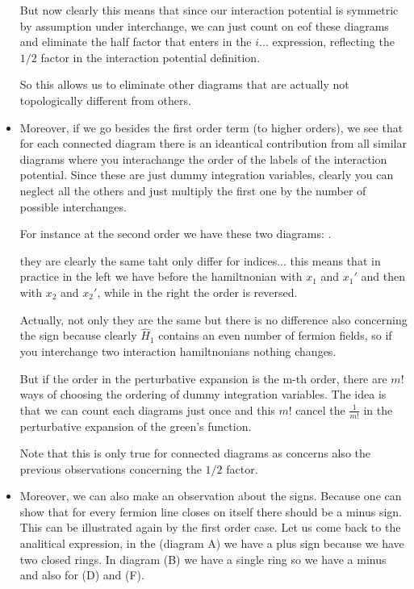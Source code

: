 \documentclass[../main/main.tex]{subfiles}
\begin{document}
\begin{itemize}
But now clearly this means that since our interaction potential is symmetric by assumption under interchange, we can just count on eof these diagrams and eliminate the half factor that enters in the \( i... \) expression, reflecting the \( 1/2 \) factor in the interaction potential definition.

So this allows us to eliminate other diagrams that are actually not topologically different  from others.


\item Moreover, if we go besides the first order term (to higher orders), we see that for each connected diagram there is an ideantical contribution from all similar diagrams where you interachange the order of the labels of the interaction potential. Since these are just dummy integration variables, clearly you can neglect all the others and just multiply the first one by the number of possible interchanges.

For instance at the second order we have these two diagrams:
.

they are clearly the same taht only differ for indices...
this means that in practice in the left we have before the hamiltnonian with \( x_1 \) and \( x_1' \) and then with \( x_2 \) and \( x_2' \), while in the right the order is reversed.

Actually, not only they are the same but there is no difference also concerning the sign because clearly \( \hat{H}_1  \) contains an even number of fermion fields, so if you interchange two interaction hamiltnonians nothing changes.

But if the order in the perturbative expansion is the m-th order, there are \( m! \) ways of choosing the ordering of dummy integration variables. The idea is that we can count each diagrams just once and this \( m! \) cancel the \( \frac{1}{m!} \) in the perturbative expansion of the green's function.

Note that this is only true for connected diagrams as concerns also the previous observations concerning the \( 1/2 \) factor.

\item Moreover, we can also make an observation about the signs. Because one can show that for every fermion line closes on itself there should be a minus sign. This can be illustrated again by the first order case. Let us come back to the analitical expression, in the (diagram A) we have a plus sign because we have two closed rings. In diagram (B) we have a single ring so we have a minus and also for (D) and (F).


\end{itemize}
\end{document}
